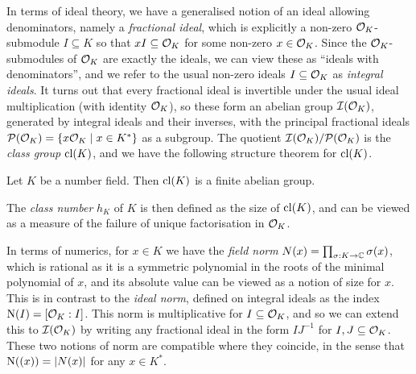 \documentclass[11pt]{report}
\begin{document}
In terms of ideal theory, we have a generalised notion of an ideal allowing denominators, namely a \emph{fractional ideal}, which is explicitly a non-zero $\mathcal{O}_K$-submodule $I \subseteq K$ so that $xI \subseteq \mathcal{O}_K$ for some non-zero $x \in \mathcal{O}_K$. Since the $\mathcal{O}_K$-submodules of $\mathcal{O}_K$ are exactly the ideals, we can view these as ``ideals with denominators'', and we refer to the usual non-zero ideals $I \subseteq \mathcal{O}_K$ as \emph{integral ideals}. It turns out that every fractional ideal is invertible under the usual ideal multiplication (with identity $\mathcal{O}_K$), so these form an abelian group $\mathcal{I}(\mathcal{O}_K)$, generated by integral ideals and their inverses, with the principal fractional ideals $\mathcal{P}(\mathcal{O}_K) = \left\{  x\mathcal{O}_K \mid x \in K^*  \right\}$ as a subgroup. The quotient $\mathcal{I}(\mathcal{O}_K) / \mathcal{P}(\mathcal{O}_K)$ is the \emph{class group} $\operatorname{cl}(K)$, and we have the following structure theorem for $\operatorname{cl}(K)$.
\begin{theorem}
    Let $K$ be a number field. Then $\operatorname{cl}(K)$ is a finite abelian group.
\end{theorem}
The \emph{class number} $h_K$ of $K$ is then defined as the size of $\operatorname{cl}(K)$, and can be viewed as a measure of the failure of unique factorisation in $\mathcal{O}_K$.

In terms of numerics, for $x \in K$ we have the \emph{field norm} $N(x) = \prod_{\sigma : K \to \mathbb{C}}\sigma(x)$, which is rational as it is a symmetric polynomial in the roots of the minimal polynomial of $x$, and its absolute value can be viewed as a notion of size for $x$. This is in contrast to the \emph{ideal norm}, defined on integral ideals as the index $\operatorname{N}(I) = [\mathcal{O}_K : I]$. This norm is multiplicative for $I \subseteq \mathcal{O}_K$, and so we can extend this to $\mathcal{I}(\mathcal{O}_K)$ by writing any fractional ideal in the form $IJ^{-1}$ for $I, J \subseteq \mathcal{O}_K$. These two notions of norm are compatible where they coincide, in the sense that $\operatorname{N}((x)) = \left| N(x) \right|$ for any $x \in K^*$.
\end{document}
